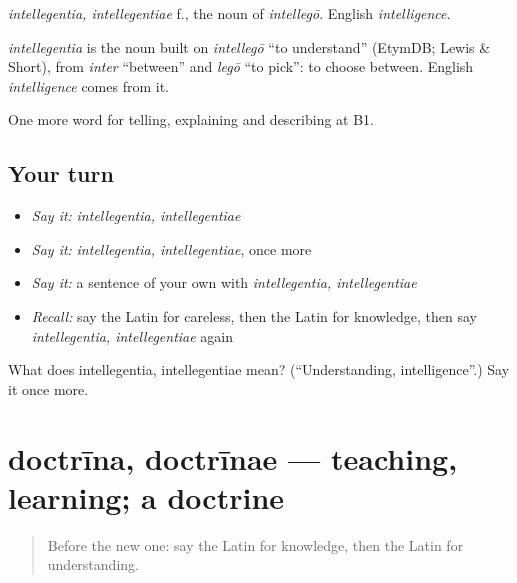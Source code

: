 \emph{intellegentia, intellegentiae} f., the noun of \emph{intellegō}. English \emph{intelligence}.

\begin{cousinweb}
\emph{intellegentia} is the noun built on \emph{intellegō} \textquotedblleft{}to understand\textquotedblright{} (EtymDB; Lewis \& Short), from \emph{inter} \textquotedblleft{}between\textquotedblright{} and \emph{legō} \textquotedblleft{}to pick\textquotedblright{}: to choose between. English \emph{intelligence} comes from it.
\end{cousinweb}

\begin{grammarlens}[title={What you've built}]
One more word for telling, explaining and describing at B1.
\end{grammarlens}

\subsection*{Your turn}
\begin{itemize}
\raggedright
  \item \emph{Say it:} \emph{intellegentia, intellegentiae}
  \item \emph{Say it:} \emph{intellegentia, intellegentiae}, once more
  \item \emph{Say it:} a sentence of your own with \emph{intellegentia, intellegentiae}
  \item \emph{Recall:} say the Latin for careless, then the Latin for knowledge, then say \emph{intellegentia, intellegentiae} again
\end{itemize}

\begin{tcolorbox}[breakable,colback=teal!4,colframe=teal!35!black,title={Before you move on}]
What does intellegentia, intellegentiae mean? (\textquotedblleft{}Understanding, intelligence\textquotedblright{}.) Say it once more.
\end{tcolorbox}
\section[doctrīna, doctrīnae]{doctrīna, doctrīnae — teaching, learning; a doctrine}

\label{lesson:LA-C407-doctrina}



\begin{quote}
Before the new one: say the Latin for knowledge, then the Latin for understanding.
\end{quote}

